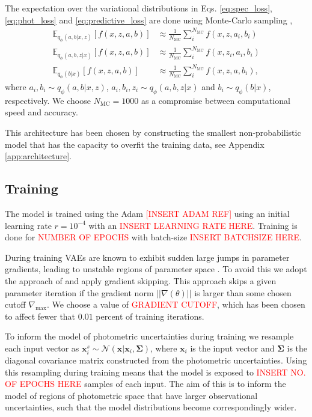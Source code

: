 The expectation over the variational distributions in Eqs. \ref{eq:spec_loss}, \ref{eq:phot_loss} and \ref{eq:predictive_loss} are done using Monte-Carlo sampling \citep{kingmaAutoEncodingVariationalBayes2022, rezendeStochasticBackpropagationApproximate2014},
\begin{align}
    \mathbb{E}_{q_\phi(a,b|x,z)}\left[f(x,z,a,b)\right] &\approx \frac{1}{N_{\text{MC}}} \sum_i^{N_{\text{MC}}} f(x,z,a_i,b_i) \\
    \mathbb{E}_{q_\phi(a,b,z|x)}\left[f(x,z,a,b)\right] &\approx \frac{1}{N_{\text{MC}}} \sum_i^{N_{\text{MC}}} f(x,z_i,a_i,b_i) \\
    \mathbb{E}_{q_\phi(b|x)}\left[f(x,z,a,b)\right] &\approx \frac{1}{N_{\text{MC}}} \sum_i^{N_{\text{MC}}} f(x,z,a,b_i),
\end{align}
where $a_i, b_i \sim q_\phi(a,b|x,z)$, $a_i, b_i, z_i \sim q_\phi(a,b,z|x)$ and $b_i \sim q_\phi(b|x)$, respectively. We choose $N_{\text{MC}} = 1000$ as a compromise between computational speed and accuracy. 

This architecture has been chosen by constructing the smallest non-probabilistic model that has the capacity to overfit the training data, see Appendix \ref{app:architecture}.

\subsection{Training}
\label{subsec:training}

The model is trained using the Adam \textcolor{red}{[INSERT ADAM REF]} using an initial learning rate $r=10^{-4}$ with an \textcolor{red}{INSERT LEARNING RATE HERE}. Training is done for \textcolor{red}{NUMBER OF EPOCHS} with batch-size \textcolor{red}{INSERT BATCHSIZE HERE}. 

During training VAEs are known to exhibit sudden large jumps in parameter gradients, leading to unstable regions of parameter space \citep{childVeryDeepVAEs2021, vahdatNVAEDeepHierarchical2021}. To avoid this we adopt the approach of \cite{childVeryDeepVAEs2021} and apply gradient skipping. This approach skips a given parameter iteration if the gradient norm $||\nabla(\theta)||$ is larger than some chosen cutoff $\nabla_\text{max}$. We choose a value of \textcolor{red}{GRADIENT CUTOFF}, which has been chosen to affect fewer that $0.01$ percent of training iterations.

To inform the model of photometric uncertainties during training we resample each input vector as $\mathbf{x}_i^s \sim \mathcal{N}(\mathbf{x}|\mathbf{x}_i, \boldsymbol{\Sigma})$, where $\mathbf{x}_i$ is the input vector and $\boldsymbol{\Sigma}$ is the diagonal covariance matrix constructed from the photometric uncertainties. Using this resampling during training means that the model is exposed to \textcolor{red}{INSERT NO. OF EPOCHS HERE} samples of each input. The aim of this is to inform the model of regions of photometric space that have larger observational uncertainties, such that the model distributions become correspondingly wider.

